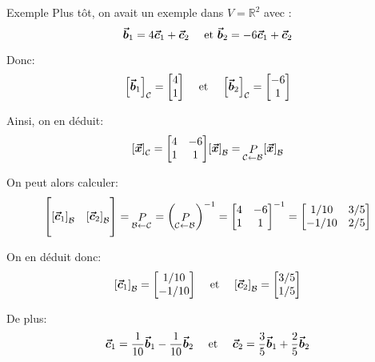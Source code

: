 \documentclass[a4paper]{article}
\begin{document}
\begin{parag}{Exemple}
    Plus tôt, on avait un exemple dans $V = \mathbb{R}^2$ avec :
    \[\bm{\protect\vec{b}}_1 = 4\bm{\protect\vec{c}}_1 + \bm{\protect\vec{c}}_2 \quad \text{ et } \bm{\protect\vec{b}}_2 = -6 \bm{\protect\vec{c}}_1 + \bm{\protect\vec{c}}_2\]

    Donc:
    \[\left[\bvec{b}_1\right]_{\mathcal{C}} = \begin{bmatrix} 4 \\ 1 \end{bmatrix} \mathspace \text{ et } \mathspace \left[\bvec{b}_2\right]_{\mathcal{C}} = \begin{bmatrix} -6 \\ 1 \end{bmatrix} \]

    Ainsi, on en déduit:
    \[\left[\bvec{x}\right]_{\mathcal{C}} = \begin{bmatrix} 4 & -6 \\ 1 & 1 \end{bmatrix} \left[\bvec{x}\right]_{\mathcal{B}} = \matricepassage{C}{B} \left[\bvec{x}\right]_{\mathcal{B}} \]

    On peut alors calculer:
    \[\begin{bmatrix}  &  \\ \left[\bvec{c}_1\right]_{\mathcal{B}} & \left[\bvec{c}_2\right]_{\mathcal{B}} \\  &  \end{bmatrix} = \matricepassage{B}{C} = \left(\matricepassage{C}{B}\right)^{-1} = \begin{bmatrix} 4 & -6 \\ 1 & 1 \end{bmatrix}^{-1} = \begin{bmatrix} 1/10 & 3 / 5 \\ -1 / 10 & 2 /  5 \end{bmatrix}  \]

    On en déduit donc:
    \[\left[\bvec{c}_1\right]_{\mathcal{B}} = \begin{bmatrix} 1 / 10 \\ -1 / 10 \end{bmatrix} \mathspace \text{ et } \mathspace \left[\bvec{c}_2\right]_{\mathcal{B}} = \begin{bmatrix} 3 / 5 \\ 1 / 5 \end{bmatrix} \]

    De plus:
    \[\bm{\protect\vec{c}}_1 = \frac{1}{10}\bm{\protect\vec{b}}_1 - \frac{1}{10}\bm{\protect\vec{b}}_2 \quad \text{ et } \quad \bm{\protect\vec{c}}_2 = \frac{3}{5}\bm{\protect\vec{b}}_1 + \frac{2}{5}\bm{\protect\vec{b}}_2\]
\end{parag}
\end{document}
